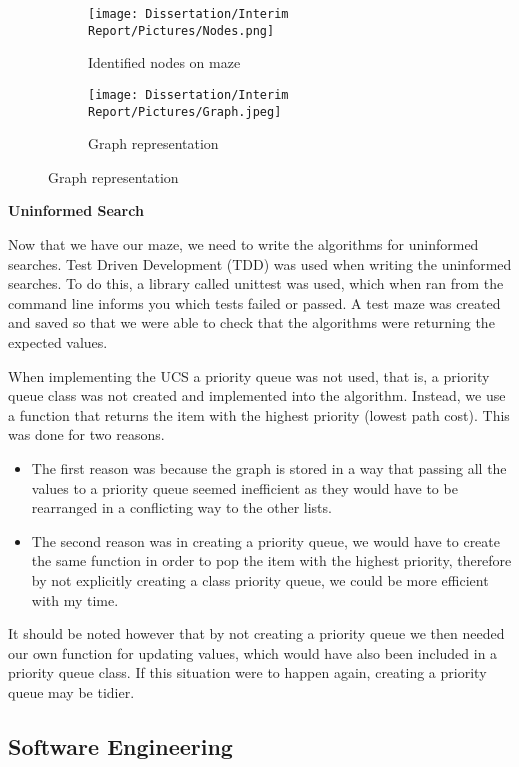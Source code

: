 \documentclass[]{final_report}
\begin{document}
\begin{figure}[h]
     \centering
     \caption{Nodes within maze}
     \begin{subfigure}[h]{0.45\textwidth}
         \centering
         \texttt{[image: Dissertation/Interim Report/Pictures/Nodes.png]}
         \caption*{Identified nodes on maze}
     \end{subfigure}
     \hfill
     \begin{subfigure}[h]{0.45\textwidth}
         \centering
         \texttt{[image: Dissertation/Interim Report/Pictures/Graph.jpeg]}
         \caption*{Graph representation}
     \end{subfigure}
     \label{Nodes}
\end{figure}

\textbf{Uninformed Search}

Now that we have our maze, we need to write the algorithms for uninformed searches. Test Driven Development (TDD) was used when writing the uninformed searches. To do this, a library called unittest was used, which when ran from the command line informs you which tests failed or passed. A test maze was created and saved so that we were able to check that the algorithms were returning the expected values.

When implementing the UCS a priority queue was not used, that is, a priority queue class was not created and implemented into the algorithm. Instead, we use a function that returns the item with the highest priority (lowest path cost). This was done for two reasons. 
\begin{itemize}
    \item The first reason was because the graph is stored in a way that passing all the values to a priority queue seemed inefficient as they would have to be rearranged in a conflicting way to the other lists.
    \item The second reason was in creating a priority queue, we would have to create the same function in order to pop the item with the highest priority, therefore by not explicitly creating a class priority queue, we could be more efficient with my time.
\end{itemize}
  It should be noted however that by not creating a priority queue we then needed our own function for updating values, which would have also been included in a priority queue class. If this situation were to happen again, creating a priority queue may be tidier.

\subsection{Software Engineering}
\end{document}

